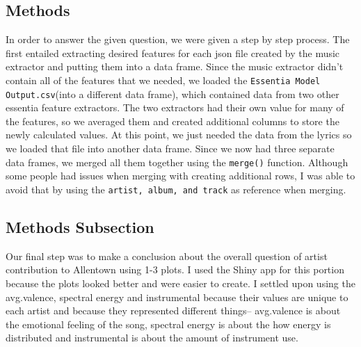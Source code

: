 \documentclass{article}\usepackage[]{graphicx}\usepackage[]{xcolor}
\begin{document}
\begin{multicols}{2}
\section{Methods}
  In order to answer the given question, we were given a step by step process. The first entailed
  extracting desired features for each json file created by the music extractor and putting them into a data frame. Since the
  music extractor didn't contain all of the features that we needed, we loaded the \texttt{Essentia Model Output.csv}(into a different data frame), which contained data from two other essentia feature extractors. The two extractors had their own value 
  for many of the features, so we averaged them and created additional columns to store the newly calculated values. At this point, we just needed the data from the lyrics so we loaded that file into another data frame. Since we now had three separate data frames, we merged all them together using the \texttt{merge()} function. Although some people had issues when merging with creating additional rows, I was able to avoid that by using the \texttt{artist, album, and track} as reference when merging. 
  

\subsection{Methods Subsection}
  Our final step was to make a conclusion about the overall question of artist contribution
  to Allentown using 1-3 plots. I used the Shiny app for this portion because the plots looked 
  better and were easier to create. I settled upon using the avg.valence, spectral energy and instrumental because their values are unique to each artist and because they represented different things-- avg.valence is about the emotional feeling of the song, spectral energy is about the how energy is distributed and instrumental is about the amount of instrument use. 

\end{multicols}
\end{document}
